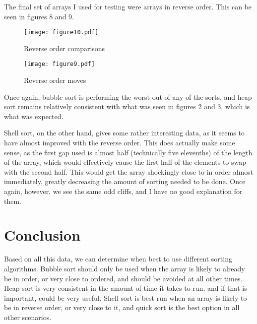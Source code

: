 \documentclass[11pt]{article}
\begin{document}
The final set of arrays I used for testing were arrays in reverse order. This can be seen in figures 8 and 9.

\begin{figure}[tbp]
\begin{centering}
\texttt{[image: figure10.pdf]}
\caption{Reverse order comparisons}
\end{centering}
\end{figure}


\begin{figure}[tbp]
\begin{centering}
\texttt{[image: figure9.pdf]}
\caption{Reverse order moves}
\end{centering}
\end{figure}

Once again, bubble sort is performing the worst out of any of the sorts, and heap sort remains relatively consistent with what was seen in figures 2 and 3, which is what was expected.

Shell sort, on the other hand, gives some rather interesting data, as it seems to have almost improved with the reverse order. This does actually make some sense, as the first gap used is almost half (technically five elevenths) of the length of the array, which would effectively cause the first half of the elements to swap with the second half. This would get the array shockingly close to in order almost immediately, greatly decreasing the amount of sorting needed to be done. Once again, however, we see the same odd cliffs, and I have no good explanation for them.

\section{Conclusion}

Based on all this data, we can determine when best to use different sorting algorithms. Bubble sort should only be used when the array is likely to already be in order, or very close to ordered, and should be avoided at all other times. Heap sort is very consistent in the amount of time it takes to run, and if that is important, could be very useful. Shell sort is best run when an array is likely to be in reverse order, or very close to it, and quick sort is the best option in all other scenarios.
\end{document}
